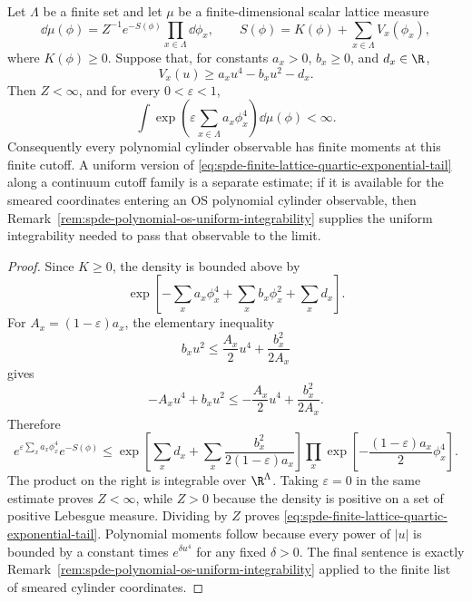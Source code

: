 \begin{lemma}
\label{lem:spde-finite-lattice-quartic-tails}
Let \(\Lambda\) be a finite set and let \(\mu\) be a finite-dimensional
scalar lattice measure
\[
  \dd\mu(\phi)=Z^{-1}e^{-S(\phi)}\prod_{x\in\Lambda}\dd\phi_x ,
  \qquad
  S(\phi)=K(\phi)+\sum_{x\in\Lambda}V_x(\phi_x),
\]
where \(K(\phi)\geq0\).  Suppose that, for constants \(a_x>0\),
\(b_x\geq0\), and \(d_x\in\R\),
\begin{equation}
  V_x(u)\geq a_xu^4-b_xu^2-d_x .
  \label{eq:spde-finite-lattice-quartic-coercivity}
\end{equation}
Then \(Z<\infty\), and for every \(0<\varepsilon<1\),
\begin{equation}
  \int
  \exp\!\left(\varepsilon\sum_{x\in\Lambda}a_x\phi_x^4\right)
  \dd\mu(\phi)
  <\infty .
  \label{eq:spde-finite-lattice-quartic-exponential-tail}
\end{equation}
Consequently every polynomial cylinder observable has finite moments at this
finite cutoff.  A uniform version of
\eqref{eq:spde-finite-lattice-quartic-exponential-tail} along a continuum
cutoff family is a separate estimate; if it is available for the smeared
coordinates entering an OS polynomial cylinder observable, then
Remark~\ref{rem:spde-polynomial-os-uniform-integrability} supplies the
uniform integrability needed to pass that observable to the limit.
\end{lemma}

\begin{proof}
Since \(K\geq0\), the density is bounded above by
\[
  \exp\!\left[
    -\sum_x a_x\phi_x^4+\sum_x b_x\phi_x^2+\sum_x d_x
  \right].
\]
For \(A_x=(1-\varepsilon)a_x\), the elementary inequality
\[
  b_xu^2\leq\frac{A_x}{2}u^4+\frac{b_x^2}{2A_x}
\]
gives
\[
  -A_xu^4+b_xu^2
  \leq
  -\frac{A_x}{2}u^4+\frac{b_x^2}{2A_x}.
\]
Therefore
\[
  e^{\varepsilon\sum_x a_x\phi_x^4}e^{-S(\phi)}
  \leq
  \exp\!\left[
    \sum_x d_x+\sum_x\frac{b_x^2}{2(1-\varepsilon)a_x}
  \right]
  \prod_x
  \exp\!\left[-\frac{(1-\varepsilon)a_x}{2}\phi_x^4\right].
\]
The product on the right is integrable over \(\R^\Lambda\).  Taking
\(\varepsilon=0\) in the same estimate proves \(Z<\infty\), while \(Z>0\)
because the density is positive on a set of positive Lebesgue measure.
Dividing by \(Z\) proves
\eqref{eq:spde-finite-lattice-quartic-exponential-tail}.  Polynomial
moments follow because every power of \(|u|\) is bounded by a constant times
\(e^{\delta u^4}\) for any fixed \(\delta>0\).  The final sentence is exactly
Remark~\ref{rem:spde-polynomial-os-uniform-integrability}
applied to the finite list of smeared cylinder coordinates.
\end{proof}

